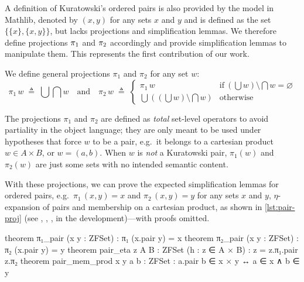 A definition of Kuratowski's ordered pairs is also provided by the model in Mathlib, denoted by \((x, y)\) for any sets \(x\) and \(y\) and is defined as the set \(\displaystyle\bigl\lbrace\lbrace x\rbrace, \lbrace x, y\rbrace\bigr\rbrace\), but lacks projections and simplification lemmas.
We therefore define projections \(\pi_1\) and \(\pi_2\) accordingly and provide simplification lemmas to manipulate them.
This represents the first contribution of our work.

\begin{definition}
  \label{def:zflean-projections}
  We define general projections \(\pi_1\) and \(\pi_2\) for any set \(w\):
  \begin{equation*}
    \pi_1\, w \;\triangleq\; \bigcup {\bigcap w} \quad\text{and}\quad \pi_2\, w \;\triangleq\;
    \begin{cases}
      \pi_1\, w                                           & \text{if}\ \left(\bigcup w\right) \setminus \bigcap w = \varnothing \\
      \bigcup \left( \left(\bigcup w\right) \setminus \bigcap w\right) & \text{otherwise}
    \end{cases}
  \end{equation*}
\end{definition}

\begin{remark}
  The projections \(\pi_1\) and \(\pi_2\) are defined as \emph{total} set-level operators to avoid partiality in the object language;
  they are only meant to be used under hypotheses that force \(w\) to be a pair, e.g.\ it belongs to a cartesian product \(w \in A\times B\), or \(w = (a,b)\).
  When \(w\) is \emph{not} a Kuratowski pair, \(\pi_1(w)\) and \(\pi_2(w)\) are just some sets with no intended semantic content.
\end{remark}

With these projections, we can prove the expected simplification lemmas for ordered pairs, e.g.\ \(\pi_1\, (x, y) = x\) and \(\pi_2\, (x, y) = y\) for any sets \(x\) and \(y\), \(\eta\)-expansion of pairs and membership on a cartesian product, as shown in \cref{lst:pair-proj} (see {\small{}}, {\small{}}, {\small{}}, {\small{}} in the development)---with proofs omitted.
\begin{leanlisting}[title={Projections for Kuratowski pairs along with simplification lemmas.}, label=lst:pair-proj]
theorem π₁_pair (x y : ZFSet) : π₁ (x.pair y) = x
theorem π₂_pair (x y : ZFSet) : π₂ (x.pair y) = y
theorem pair_eta {z A B : ZFSet} (h : z ∈ A × B) : z = z.π₁.pair z.π₂
theorem pair_mem_prod {x y a b : ZFSet} :
  a.pair b ∈ x × y ↔ a ∈ x ∧ b ∈ y
\end{leanlisting}


